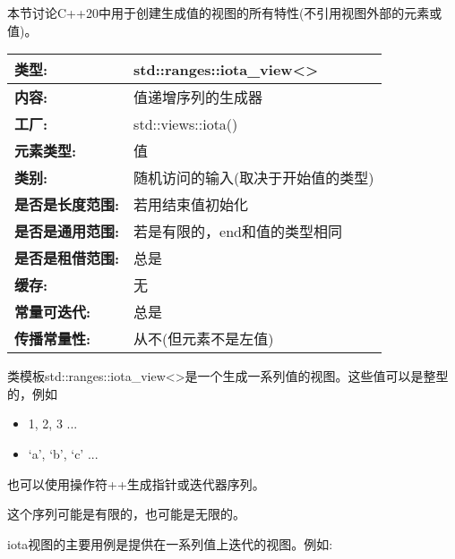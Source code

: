 
本节讨论C++20中用于创建生成值的视图的所有特性(不引用视图外部的元素或值)。


\begin{longtable}[c]{|l|l|}
\hline
\textbf{类型:}                 & std::ranges::iota\_view\textless{}\textgreater{} \\ \hline
\endfirsthead
%
\endhead
%
\textbf{内容:}              & 值递增序列的生成器  \\ \hline
\textbf{工厂:}              & std::views::iota()                               \\ \hline
\textbf{元素类型:}         & 值                                           \\ \hline
\textbf{类别:}        & 随机访问的输入(取决于开始值的类型) \\ \hline
\textbf{是否是长度范围:}       & 若用结束值初始化                 \\ \hline
\textbf{是否是通用范围:} & 若是有限的，end和值的类型相同         \\ \hline
\textbf{是否是租借范围:}    & 总是                                           \\ \hline
\textbf{缓存:}               & 无                                          \\ \hline
\textbf{常量可迭代:}       & 总是                                           \\ \hline
\textbf{传播常量性:} & 从不(但元素不是左值)              \\ \hline
\end{longtable}

类模板std::ranges::iota\_view<>是一个生成一系列值的视图。这些值可以是整型的，例如

\begin{itemize}
\item
1, 2, 3 ...

\item
‘a’, ‘b’, ‘c’ ...
\end{itemize}

也可以使用操作符++生成指针或迭代器序列。

这个序列可能是有限的，也可能是无限的。

iota视图的主要用例是提供在一系列值上迭代的视图。例如:

